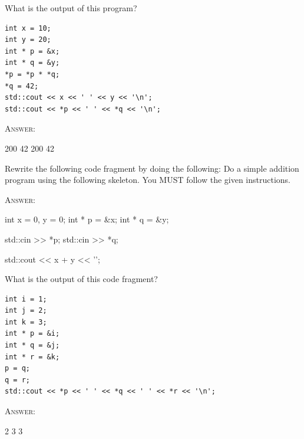 \newpage
\nextq
What is the output of this program?
\begin{Verbatim}[frame=single]
int x = 10;
int y = 20;
int * p = &x;
int * q = &y;
*p = *p * *q;
*q = 42;
std::cout << x << ' ' << y << '\n';
std::cout << *p << ' ' << *q << '\n';
\end{Verbatim}

\textsc{Answer:}
\begin{answercode}
200 42
200 42
\end{answercode}

\newpage
\nextq
Rewrite the following code fragment by doing the following: Do a simple addition
program using the following skeleton.
You MUST follow the given instructions.

\textsc{Answer:}
\begin{answercode}
int x = 0, y = 0;
int * p = &x;
int * q = &y;

std::cin >> *p;
std::cin >> *q;

std::cout << x + y << '\n';
\end{answercode}

\newpage
\nextq
What is the output of this code fragment?
\begin{Verbatim}[frame=single]
int i = 1;
int j = 2;
int k = 3;
int * p = &i;
int * q = &j;
int * r = &k;
p = q;
q = r;
std::cout << *p << ' ' << *q << ' ' << *r << '\n'; 
\end{Verbatim}

\textsc{Answer:}
\begin{answercode}
2 3 3
\end{answercode}

